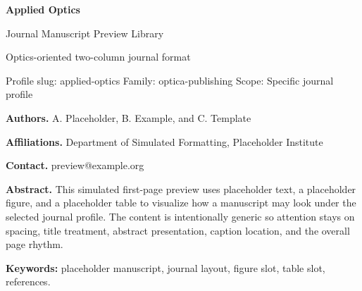 \documentclass[10pt,a4paper]{article}
\begin{document}
\begin{center}
{\LARGE\bfseries Applied Optics}\par
\vspace{0.25em}
{\small Journal Manuscript Preview Library}\par
\vspace{0.15em}
{\footnotesize Optics-oriented two-column journal format}\par
\vspace{0.2em}
{\footnotesize Profile slug: applied-optics \quad Family: optica-publishing \quad Scope: Specific journal profile}
\end{center}
\vspace{0.2em}



\noindent\textbf{Authors.} A. Placeholder, B. Example, and C. Template\par
\noindent\textbf{Affiliations.} Department of Simulated Formatting, Placeholder Institute\par
\noindent\textbf{Contact.} preview@example.org\par
\vspace{0.4em}
\noindent\textbf{Abstract.} This simulated first-page preview uses placeholder text, a placeholder figure, and a placeholder table to visualize how a manuscript may look under the selected journal profile. The content is intentionally generic so attention stays on spacing, title treatment, abstract presentation, caption location, and the overall page rhythm.\par\vspace{0.6em}
\noindent\textbf{Keywords:} placeholder manuscript, journal layout, figure slot, table slot, references.\par\vspace{0.6em}
\end{document}
